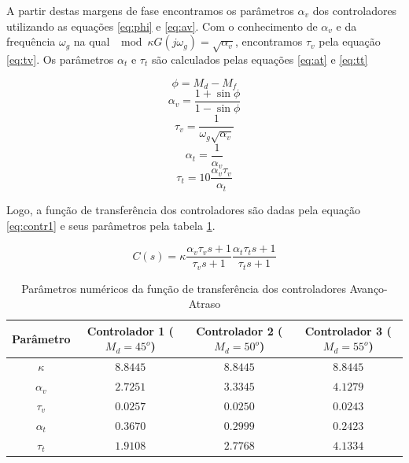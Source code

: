 \documentclass{article}
\begin{document}
A partir destas margens de fase encontramos os parâmetros $\alpha_v$ dos controladores utilizando as equações \ref{eq:phi} e \ref{eq:av}. Com o conhecimento de $\alpha_v$ e da frequência $\omega_g$ na qual $\mod{\kappa G(j\omega_g)}=\sqrt{\alpha_v}$, encontramos $\tau_v$ pela equação \ref{eq:tv}. Os parâmetros $\alpha_t$ e $\tau_t$ são calculados pelas equações \ref{eq:at} e \ref{eq:tt}

\begin{equation}
\label{eq:phi}
\phi=M_d-M_f
\end{equation}
\begin{equation}
	\label{eq:av}
	\alpha_v=\frac{1+\sin{\phi}}{1-\sin{\phi}}
\end{equation}
\begin{equation}
	\label{eq:tv}
	\tau_v=\frac{1}{\omega_g \sqrt{\alpha_v}}
\end{equation}
\begin{equation}
\label{eq:at}
\alpha_t=\frac{1}{\alpha_v}
\end{equation}
\begin{equation}
\label{eq:tt}
\tau_t=10\frac{\alpha_v \tau_v}{\alpha_t}
\end{equation}

Logo, a função de transferência dos controladores são dadas pela equação \ref{eq:contr1} e seus parâmetros pela tabela \ref{tab:contr}.

\begin{equation}
\label{eq:contr}
C(s)=\kappa \frac{\alpha_v \tau_v s + 1}{\tau_v s + 1} \frac{\alpha_t \tau_t s + 1}{\tau_t s + 1}
\end{equation}

\begin{table}[H]
	\centering
	\caption{Parâmetros numéricos da função de transferência dos controladores Avanço-Atraso}
	\label{tab:contr}
	\begin{tabular}{|c|c|c|c|}
		\hline Parâmetro & Controlador 1 ($M_d = 45^o$)& Controlador 2 ($M_d = 50^o$)& Controlador 3 ($M_d = 55^o$)\\ 
		\hline $\kappa$ & $8.8445$ & $8.8445$ & $8.8445$\\ 
		\hline $\alpha_v$ & $2.7251$ & $3.3345$ & $4.1279$\\ 
		\hline $\tau_v$ & $0.0257$ & $0.0250$ & $0.0243$\\ 
		\hline $\alpha_t$ & $0.3670$ & $0.2999$ & $0.2423$\\ 
		\hline $\tau_t$ & $1.9108$ & $2.7768$ & $4.1334$\\ 
		\hline 
	\end{tabular} 
\end{table}
\end{document}

